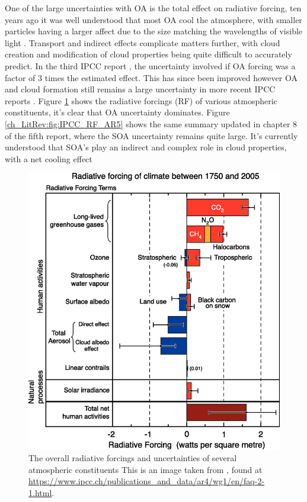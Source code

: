     One of the large uncertainties with OA is the total effect on radiative forcing, ten years ago it was well understood that most OA cool the atmosphere, with smaller particles having a larger affect due to the size matching the wavelengths of visible light \citep{Kanakidou2005}. 
    Transport and indirect effects complicate matters further, with cloud creation and modification of cloud properties being quite difficult to accurately predict.
    In the third IPCC report \citep{IPCC2001}, the uncertainty involved if OA forcing was a factor of 3 times the estimated effect. 
    This has since been improved however OA and cloud formation still remains a large uncertainty in more recent IPCC reports \citep{IPCC_Chapter2}.
    Figure \ref{ch_LitRev:fig:IPCC_RF_AR4} shows the radiative forcings (RF) of various atmospheric constituents, it's clear that OA uncertainty dominates.
    Figure \ref{ch_LitRev:fig:IPCC_RF_AR5} shows the same summary updated in chapter 8 of the fifth report, where the SOA uncertainty remains quite large.
    It's currently understood that SOA's play an indirect and complex role in cloud properties, with a net cooling effect \citep[Chapter 7,8]{IPCC_AR5_WG1}
    
    \begin{figure}
      \includegraphics{Figures/IPCC_WG1AR4_RFSummary.png}
      \caption{%
        The overall radiative forcings and uncertainties of several atmospheric constituents
	      This is an image taken from \cite{IPCC_Chapter2}, found at \url{https://www.ipcc.ch/publications_and_data/ar4/wg1/en/faq-2-1.html}.}
      \label{ch_LitRev:fig:IPCC_RF_AR4}
    \end{figure}

